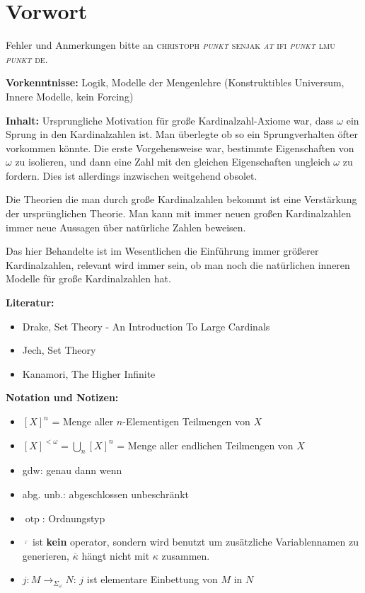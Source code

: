 \documentclass[a4paper,fontsize=11pt]{scrartcl}
\newcommand{\otp}{\operatorname{otp}}
\begin{document}
\flushleft
\section*{Vorwort}
Fehler und Anmerkungen bitte an \textsc{christoph {\it punkt} senjak {\it at} ifi {\it punkt} lmu {\it punkt} de}.

{\bf Vorkenntnisse:} Logik, Modelle der Mengenlehre (Konstruktibles
Universum, Innere Modelle, kein Forcing)

{\bf Inhalt:} Ursprungliche Motivation für große Kardinalzahl-Axiome
war, dass $\omega$ ein Sprung in den Kardinalzahlen ist. Man überlegte
ob so ein Sprungverhalten öfter vorkommen könnte. Die erste
Vorgehensweise war, bestimmte Eigenschaften von $\omega$ zu isolieren,
und dann eine Zahl mit den gleichen Eigenschaften ungleich $\omega$ zu
fordern. Dies ist allerdings inzwischen weitgehend obsolet.

Die Theorien die man durch große Kardinalzahlen bekommt ist eine
Verstärkung der ursprünglichen Theorie. Man kann mit immer neuen
großen Kardinalzahlen immer neue Aussagen über natürliche Zahlen
beweisen.

Das hier Behandelte ist im Wesentlichen die Einführung immer größerer
Kardinalzahlen, relevant wird immer sein, ob man noch die natürlichen
inneren Modelle für große Kardinalzahlen hat.

{\bf Literatur:}
\begin{itemize}
  \item Drake, Set Theory - An Introduction To Large Cardinals
  \item Jech, Set Theory
  \item Kanamori, The Higher Infinite
\end{itemize}

{\bf Notation und Notizen:}
\begin{itemize}
  \item $[X]^n$ = Menge aller $n$-Elementigen Teilmengen von $X$
  \item $[X]^{<\omega} = \bigcup_n[X]^n$ = Menge aller endlichen
    Teilmengen von $X$
  \item gdw: genau dann wenn
  \item abg. unb.: abgeschlossen unbeschränkt
  \item $\otp$: Ordnungstyp
  \item $\overline{\cdot}$ ist {\bf kein} operator, sondern wird
    benutzt um zusätzliche Variablennamen zu generieren,
    $\overline{\kappa}$ hängt nicht mit $\kappa$ zusammen.
  \item $j:M\rightarrow_{\Sigma_\omega} N$: $j$ ist elementare
    Einbettung von $M$ in $N$
\end{itemize}
\end{document}
